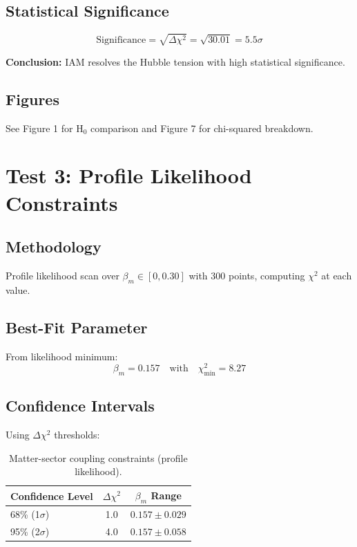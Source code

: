 \documentclass[11pt,letterpaper]{article}
\begin{document}
\subsection{Statistical Significance}

\begin{equation}
\text{Significance} = \sqrt{\Delta\chi^2} = \sqrt{30.01} = 5.5\sigma
\end{equation}

\noindent\textbf{Conclusion:} IAM resolves the Hubble tension with high statistical significance.

\subsection{Figures}

See Figure 1 for H$_0$ comparison and Figure 7 for chi-squared breakdown.

\section{Test 3: Profile Likelihood Constraints}

\subsection{Methodology}

Profile likelihood scan over $\beta_m \in [0, 0.30]$ with 300 points, computing $\chi^2$ at each value.

\subsection{Best-Fit Parameter}

From likelihood minimum:
\begin{equation}
\beta_m = 0.157 \quad \text{with} \quad \chi^2_{\min} = 8.27
\end{equation}

\subsection{Confidence Intervals}

Using $\Delta\chi^2$ thresholds:

\begin{table}[h]
\centering
\begin{tabular}{lcc}
\toprule
Confidence Level & $\Delta\chi^2$ & $\beta_m$ Range \\
\midrule
68\% (1$\sigma$) & 1.0 & $0.157 \pm 0.029$ \\
95\% (2$\sigma$) & 4.0 & $0.157 \pm 0.058$ \\
\bottomrule
\end{tabular}
\caption{Matter-sector coupling constraints (profile likelihood).}
\end{table}
\end{document}
